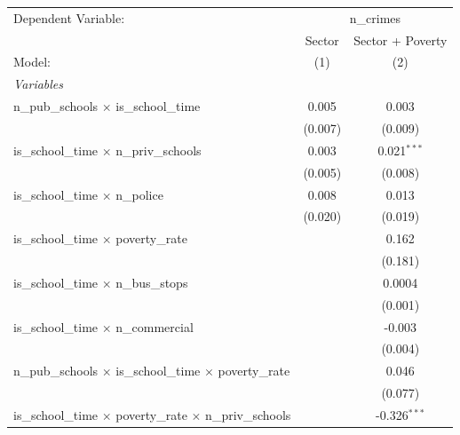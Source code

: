 
\begingroup
\centering
\begin{tabular}{lcc}
   \tabularnewline \midrule \midrule
   Dependent Variable: & \multicolumn{2}{c}{n\_crimes}\\
                                                                            & Sector    & Sector + Poverty \\   
   Model:                                                                   & (1)       & (2)\\  
   \midrule
   \emph{Variables}\\
   n\_pub\_schools $\times$ is\_school\_time                                & 0.005     & 0.003\\   
                                                                            & (0.007)   & (0.009)\\   
   is\_school\_time $\times$ n\_priv\_schools                               & 0.003     & 0.021$^{***}$\\   
                                                                            & (0.005)   & (0.008)\\   
   is\_school\_time $\times$ n\_police                                      & 0.008     & 0.013\\   
                                                                            & (0.020)   & (0.019)\\   
   is\_school\_time $\times$ poverty\_rate                                  &           & 0.162\\   
                                                                            &           & (0.181)\\   
   is\_school\_time $\times$ n\_bus\_stops                                  &           & 0.0004\\   
                                                                            &           & (0.001)\\   
   is\_school\_time $\times$ n\_commercial                                  &           & -0.003\\   
                                                                            &           & (0.004)\\   
   n\_pub\_schools $\times$ is\_school\_time $\times$ poverty\_rate         &           & 0.046\\   
                                                                            &           & (0.077)\\   
   is\_school\_time $\times$ poverty\_rate $\times$ n\_priv\_schools        &           & -0.326$^{***}$\\   

\end{tabular}

